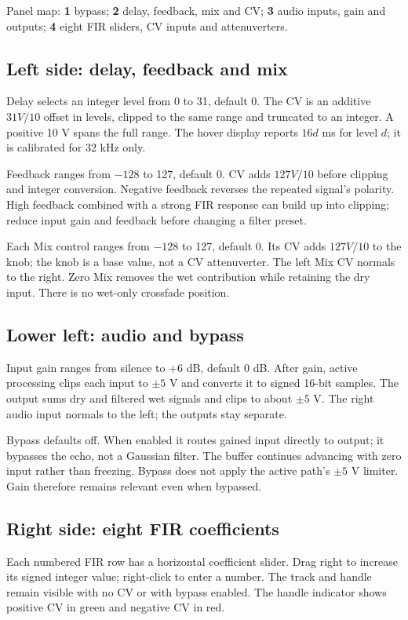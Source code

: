 Panel map: \textbf{1} bypass;
\textbf{2} delay, feedback, mix and CV;
\textbf{3} audio inputs, gain and outputs;
\textbf{4} eight FIR sliders, CV inputs and attenuverters.

\subsection{Left side: delay, feedback and mix}
Delay selects an integer level from 0 to 31, default 0. The CV is an additive
$31V/10$ offset in levels, clipped to the same range and truncated to an
integer. A positive 10 V spans the full range. The hover display reports
$16d$ ms for level $d$; it is calibrated for 32 kHz only.

Feedback ranges from $-128$ to 127, default 0. CV adds $127V/10$ before
clipping and integer conversion. Negative feedback reverses the repeated
signal's polarity. High feedback combined with a strong FIR response can
build up into clipping; reduce input gain and feedback before changing a
filter preset.

Each Mix control ranges from $-128$ to 127, default 0. Its CV adds
$127V/10$ to the knob; the knob is a base value, not a CV attenuverter.
The left Mix CV normals to the right. Zero Mix removes the wet contribution
while retaining the dry input. There is no wet-only crossfade position.
\subsection{Lower left: audio and bypass}
Input gain ranges from silence to +6 dB, default 0 dB. After gain, active
processing clips each input to $\pm5$ V and converts it to signed 16-bit
samples. The output sums dry and filtered wet signals and clips to about
$\pm5$ V. The right audio input normals to the left; the outputs stay separate.

Bypass defaults off. When enabled it routes gained input directly to output;
it bypasses the echo, not a Gaussian filter. The buffer continues advancing
with zero input rather than freezing. Bypass does not apply the active path's
$\pm5$ V limiter. Gain therefore remains relevant even when bypassed.
\subsection{Right side: eight FIR coefficients}
Each numbered FIR row has a horizontal coefficient slider. Drag right to
increase its signed integer value; right-click to enter a number. The track
and handle remain visible with no CV or with bypass enabled. The handle
indicator shows positive CV in green and negative CV in red.

